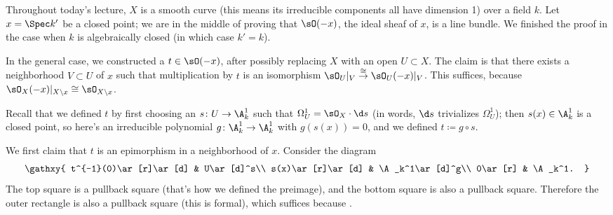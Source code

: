Throughout today's lecture, $X$ is a smooth curve (this means its irreducible components all have dimension 1) over
a field $k$. Let $x = \Spec k'$ be a closed point; we are in the middle of proving that $\sO(-x)$, the ideal sheaf
of $x$, is a line bundle. We finished the proof in the case when $k$ is algebraically closed (in which case $k' =
k$).

In the general case, we constructed a $t\in\sO(-x)$, after possibly replacing $X$ with an open $U\subset X$. The
claim is that there exists a neighborhood $V\subset U$ of $x$ such that multiplication by $t$ is an isomorphism
$\sO_U|_V\overset\cong\to\sO_U(-x)|_V$. This suffices, because $\sO_X(-x)|_{X\setminus x}\cong\sO_{X\setminus x}$.

Recall that we defined $t$ by first choosing an $s\colon U\to\A_k^1$ such that $\Omega_U^1 = \sO_X\cdot\d s$ (in
words, $\d s$ trivializes $\Omega_U^1$); then $s(x)\in\A_k^1$ is a closed point, so here's an irreducible
polynomial $g\colon\A_k^1\to\A_k^1$ with $g(s(x)) = 0$, and we defined $t\coloneqq g\circ s$.

We first claim that $t$ is an epimorphism in a neighborhood of $x$. Consider the diagram
\begin{equation}
\gathxy{
	t^{-1}(0)\ar[r]\ar[d] & U\ar[d]^s\\
	s(x)\ar[r]\ar[d] & \A_k^1\ar[d]^g\\
	0\ar[r] & \A_k^1.
}
\end{equation}
The top square is a pullback square (that's how we defined the preimage), and the bottom square is also a pullback
square. Therefore the outer rectangle is also a pullback square (this is formal), which suffices because \TODO.

